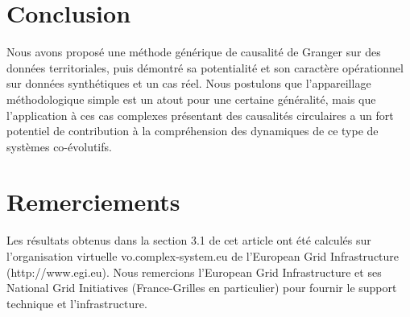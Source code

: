 \documentclass[french]{./sageo}
\begin{document}
\section{Conclusion}

Nous avons proposé une méthode générique de causalité de Granger sur des données territoriales, puis démontré sa potentialité et son caractère opérationnel sur données synthétiques et un cas réel. Nous postulons que l'appareillage méthodologique simple est un atout pour une certaine généralité, mais que l'application à ces cas complexes présentant des causalités circulaires a un fort potentiel de contribution à la compréhension des dynamiques de ce type de systèmes co-évolutifs.


\section*{Remerciements}

Les résultats obtenus dans la section 3.1 de cet article ont été calculés sur l'organisation virtuelle vo.complex-system.eu de l'European Grid Infrastructure (http://www.egi.eu). Nous remercions l'European Grid Infrastructure et ses National Grid Initiatives (France-Grilles en particulier) pour fournir le support technique et l'infrastructure.












\end{document}
